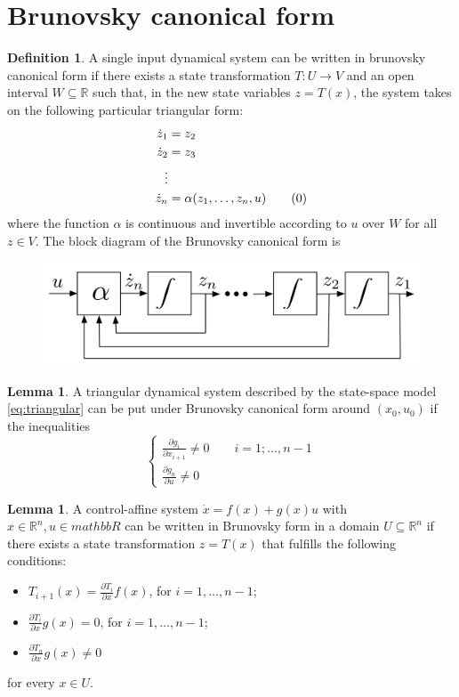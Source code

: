 \documentclass[12pt, openany]{report}
\theoremstyle{definition}
\newtheorem{definition}[thm]{Definition}
\newtheorem{lem}[thm]{Lemma}
\newcommand{\R}{\mathbb{R}}
\begin{document}
\section{Brunovsky canonical form}
\begin{definition} A single input dynamical system can be written in brunovsky canonical form if there exists a state transformation \(T:U\rightarrow V\) and an open interval \(W\subseteq \R\) such that, in the new state variables \(z=T(x)\), the system takes on the following particular triangular form:
\begin{align}
    \dot z_1 &= z_2\nonumber\\
    \dot z_2 &= z_3\nonumber\\
    \vdots&\nonumber\\
    \dot z_n &= \alpha(z_1,\dots,z_n,u)\tag{\theequation}  \refstepcounter{equation}
\end{align}
where the function \(\alpha\) is continuous and invertible according to \(u\) over \(W\) for all \(z\in V\). The block diagram of the Brunovsky canonical form is
\begin{figure}[H]
    \centering
    \includegraphics[width = .5\textwidth]{img/block_brunovsky.png}
\end{figure}
\end{definition}
\begin{lem}
    A triangular dynamical system described by the state-space model \eqref{eq:triangular} can be put under Brunovsky canonical form around \((x_0,u_0)\) if the inequalities 
    \begin{equation}
        \begin{cases}
            \frac{\partial g_i}{\partial x_{i+1}}\neq 0 \qquad i=1;\dots,n-1\\
            \frac{\partial g_n}{\partial u}\neq 0
        \end{cases}
    \end{equation}
\end{lem}
\begin{lem}
    A control-affine system \(\dot x =f(x)+g(x)u\) with \(x\in \R^n,u\in mathbb{R}\) can be written in Brunovsky form in a domain \(U\subseteq \R^n\) if there exists a state transformation \(z=T(x)\) that fulfills the following conditions:
\end{lem}
\begin{itemize}
    \item \(T_{i+1}(x) = \frac{\partial T_i}{\partial x}f(x)\), for \(i=1,\dots,n-1\);
    \item \(\frac{\partial T_i}{\partial x}g(x)= 0\), for \(i=1,\dots,n-1\);
    \item \(\frac{\partial T_n}{\partial x}g(x)\neq 0\)
\end{itemize}
for every \(x\in U\).
\end{document}
